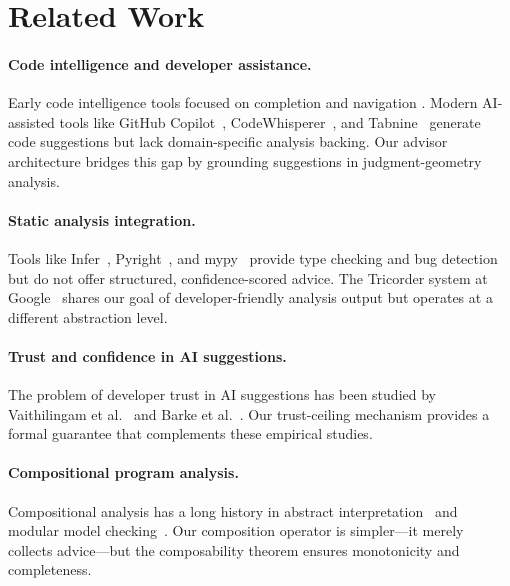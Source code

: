 \documentclass[11pt]{article}
\begin{document}
\section{Related Work}\label{sec:related}

\paragraph{Code intelligence and developer assistance.}
Early code intelligence tools focused on completion and navigation
\cite{murphy2006java, robillard2015recommending}.  Modern AI-assisted
tools like GitHub Copilot~\cite{chen2021copilot},
CodeWhisperer~\cite{codewhisperer2023}, and
Tabnine~\cite{tabnine2023} generate code suggestions but lack
domain-specific analysis backing.  Our advisor architecture bridges
this gap by grounding suggestions in judgment-geometry analysis.

\paragraph{Static analysis integration.}
Tools like Infer~\cite{calcagno2015infer},
Pyright~\cite{pyright2023}, and mypy~\cite{lehtosalo2016mypy}
provide type checking and bug detection but do not offer structured,
confidence-scored advice.  The Tricorder system at
Google~\cite{sadowski2015tricorder} shares our goal of
developer-friendly analysis output but operates at a different
abstraction level.

\paragraph{Trust and confidence in AI suggestions.}
The problem of developer trust in AI suggestions has been studied
by Vaithilingam et al.~\cite{vaithilingam2022expectation} and
Barke et al.~\cite{barke2023grounded}.  Our trust-ceiling mechanism
provides a formal guarantee that complements these empirical studies.

\paragraph{Compositional program analysis.}
Compositional analysis has a long history in abstract
interpretation~\cite{cousot1977abstract, cousot2002modular} and
modular model checking~\cite{beyer2007compositional}.  Our
composition operator is simpler—it merely collects advice—but
the composability theorem ensures monotonicity and completeness.
\end{document}
